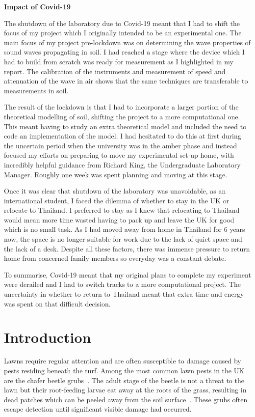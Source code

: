 \documentclass[twocolumn]{article}
\begin{document}
\newpage
\thispagestyle{empty}

\begin{center}
    \Large\textbf{Impact of Covid-19}
\end{center}
The shutdown of the laboratory due to Covid-19 meant that I had to shift the focus of my project which I originally intended to be an experimental one. The main focus of my project pre-lockdown was on determining the wave properties of sound waves propagating in soil. I had reached a stage where the device which I had to build from scratch was ready for measurement as I highlighted in my report. The calibration of the instruments and measurement of speed and attenuation of the wave in air shows that the same techniques are transferable to measurements in soil.

The result of the lockdown is that I had to incorporate a larger portion of the theoretical modelling of soil, shifting the project to a more computational one. This meant having to study an extra theoretical model and included the need to code an implementation of the model. I had hesitated to do this at first during the uncertain period when the university was in the amber phase and instead focused my efforts on preparing to move my experimental set-up home, with incredibly helpful guidance from Richard King, the Undergraduate Laboratory Manager. Roughly one week was spent planning and moving at this stage.

Once it was clear that shutdown of the laboratory was unavoidable, as an international student, I faced the dilemma of whether to stay in the UK or relocate to Thailand. I preferred to stay as I knew that relocating to Thailand would mean more time wasted having to pack up and leave the UK for good which is no small task. As I had moved away from home in Thailand for 6 years now, the space is no longer suitable for work due to the lack of quiet space and the lack of a desk. Despite all these factors, there was immense pressure to return home from concerned family members so everyday was a constant debate.

To summarise, Covid-19 meant that my original plans to complete my experiment were derailed and I had to switch tracks to a more computational project. The uncertainty in whether to return to Thailand meant that extra time and energy was spent on that difficult decision.
\thispagestyle{empty}
\newpage
\twocolumn

\tableofcontents

\section{Introduction}
Lawns require regular attention and are often susceptible to damage caused by pests residing beneath the turf. Among the most common lawn pests in the UK are the chafer beetle grubs~\cite{alford_2012}. The adult stage of the beetle is not a threat to the lawn but their root-feeding larvae eat away at the roots of the grass, resulting in dead patches which can be peeled away from the soil surface~\cite{smitley_2012}. These grubs often escape detection until significant visible damage had occurred.
\end{document}
